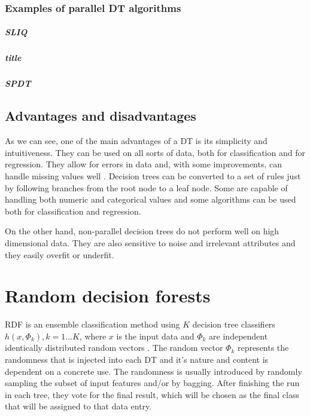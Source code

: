 \documentclass[thesis=B,english]{FITthesis}[2012/10/20]
\begin{document}
		\subsection{Examples of parallel DT algorithms}
			\paragraph*{SLIQ}
			\paragraph*{title}
			\paragraph*{SPDT} 
		\section{Advantages and disadvantages}
		As we can see, one of the main advantages of a DT is its simplicity and intuitiveness. They can be used on all sorts of data, both for classification and for regression. They allow for errors in data and, with some improvements, can handle missing values well \cite{DMWithDecisionTrees,CMP07}. Decision trees can be converted to a set of rules just by following branches from the root node to a leaf node. Some are capable of handling both numeric and categorical values and some algorithms can be used both for classification and regression.

		On the other hand, non-parallel decision trees do not perform well on high dimensional data. They are also sensitive to noise and irrelevant attributes and they easily overfit or underfit.
\chapter{Random decision forests}
\label{chap:RDF}
	RDF is an ensemble classification method using \(K\) decision tree classifiers \({h(x, \Phi_k), k = 1\dots K} \), where \(x\) is the input data and \({\Phi_k}\) are independent identically distributed random vectors \cite{SELECTION_OF_DT}. The random vector \(\Phi_k\) represents the randomness that is injected into each DT and it's nature and content is dependent on a concrete use. The randomness is usually introduced by randomly sampling the subset of input features and/or by bagging. After finishing the run in each tree, they vote for the final result, which will be chosen as the final class that will be assigned to that data entry.
\end{document}
